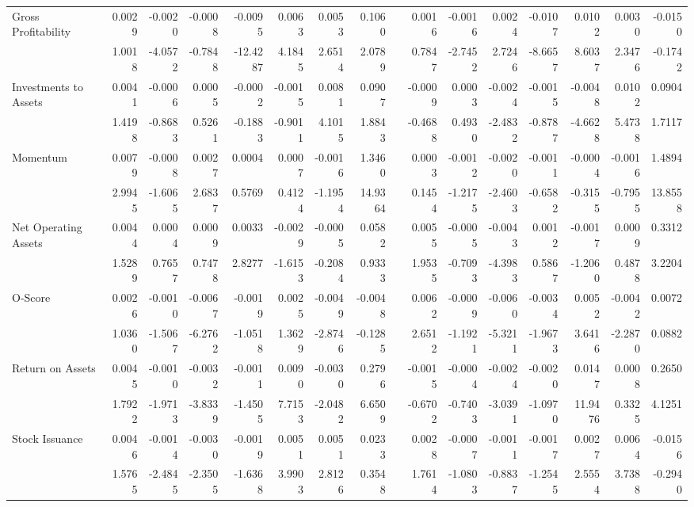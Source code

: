 \begin{sidewaystable}[htbp]
{\begin{tabular}{lrrrrrrrrrrrrrrr}
Gross Profitability & 0.0029 & -0.0020 & -0.0008 & -0.0095 & 0.0063 & 0.0053 & 0.1060 &       & 0.0016 & -0.0016 & 0.0024 & -0.0107 & 0.0102 & 0.0030 & -0.0150 \\
& 1.0018 & -4.0572 & -0.7848 & -12.4287 & 4.1845 & 2.6514 & 2.0789 &       & 0.7847 & -2.7452 & 2.7246 & -8.6657 & 8.6037 & 2.3476 & -0.1742 \\
Investments to Assets & 0.0041 & -0.0006 & 0.0005 & -0.0002 & -0.0015 & 0.0081 & 0.0907 &       & -0.0009 & 0.0003 & -0.0024 & -0.0015 & -0.0048 & 0.0102 & 0.0904 \\
& 1.4198 & -0.8683 & 0.5261 & -0.1883 & -0.9011 & 4.1015 & 1.8843 &       & -0.4688 & 0.4930 & -2.4832 & -0.8787 & -4.6628 & 5.4738 & 1.7117 \\
Momentum & 0.0079 & -0.0008 & 0.0027 & 0.0004 & 0.0007 & -0.0016 & 1.3460 &       & 0.0003 & -0.0012 & -0.0020 & -0.0011 & -0.0004 & -0.0016 & 1.4894 \\
& 2.9945 & -1.6065 & 2.6837 & 0.5769 & 0.4124 & -1.1954 & 14.9364 &       & 0.1454 & -1.2175 & -2.4603 & -0.6582 & -0.3155 & -0.7955 & 13.8558 \\
Net Operating Assets & 0.0044 & 0.0004 & 0.0009 & 0.0033 & -0.0029 & -0.0005 & 0.0582 &       & 0.0055 & -0.0005 & -0.0043 & 0.0012 & -0.0017 & 0.0009 & 0.3312 \\
& 1.5289 & 0.7657 & 0.7478 & 2.8277 & -1.6153 & -0.2084 & 0.9333 &       & 1.9535 & -0.7093 & -4.3983 & 0.5867 & -1.2060 & 0.4878 & 3.2204 \\
O-Score & 0.0026 & -0.0010 & -0.0067 & -0.0019 & 0.0025 & -0.0049 & -0.0048 &       & 0.0062 & -0.0009 & -0.0060 & -0.0034 & 0.0052 & -0.0042 & 0.0072 \\
& 1.0360 & -1.5067 & -6.2762 & -1.0518 & 1.3629 & -2.8746 & -0.1285 &       & 2.6512 & -1.1921 & -5.3211 & -1.9673 & 3.6416 & -2.2870 & 0.0882 \\
Return on Assets & 0.0045 & -0.0010 & -0.0032 & -0.0011 & 0.0090 & -0.0030 & 0.2796 &       & -0.0015 & -0.0004 & -0.0024 & -0.0020 & 0.0147 & 0.0008 & 0.2650 \\
& 1.7922 & -1.9713 & -3.8339 & -1.4505 & 7.7153 & -2.0482 & 6.6509 &       & -0.6702 & -0.7403 & -3.0391 & -1.0970 & 11.9476 & 0.3325 & 4.1251 \\
Stock Issuance & 0.0046 & -0.0014 & -0.0030 & -0.0019 & 0.0051 & 0.0051 & 0.0233 &       & 0.0028 & -0.0007 & -0.0011 & -0.0017 & 0.0027 & 0.0064 & -0.0156 \\
& 1.5765 & -2.4845 & -2.3505 & -1.6368 & 3.9903 & 2.8126 & 0.3548 &       & 1.7614 & -1.0803 & -0.8837 & -1.2545 & 2.5554 & 3.7388 & -0.2940 \\
\bottomrule
\end{tabular}%
}
\label{tab:epu-ff6}%
\end{sidewaystable}%

